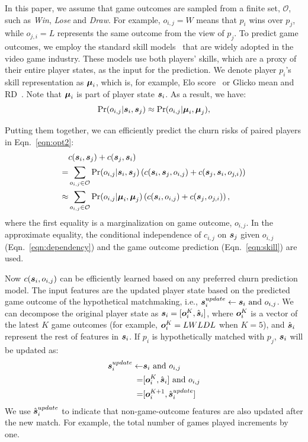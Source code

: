 In this paper, we assume that game outcomes are sampled from a finite set, $\mathcal{O}$, such as \emph{Win}, \emph{Lose} and \emph{Draw}. For example, $o_{i,j}=W$ means that $p_i$ wins over $p_j$, while $o_{j,i}=L$ represents the same outcome from the view of $p_j$. To predict game outcomes, we employ the standard skill models~\cite{elo1978rating,glickman1999parameter} that are widely adopted in the video game industry. These models use both players' skills, which are a proxy of their entire player states, as the input for the prediction. We denote player $p_i$'s skill representation as $\boldsymbol{\mu}_i$, which is, for example, Elo score~\cite{elo1978rating} or Glicko mean and RD~\cite{glickman1999parameter}. Note that $\boldsymbol{\mu}_i$ is part of player state $\boldsymbol{s}_i$.  As a result, we have:
\begin{equation}\label{eqn:skill}
\Pr(o_{i,j}|\boldsymbol{s}_i, \boldsymbol{s}_j) \approx \Pr(o_{i,j}|\boldsymbol{\mu}_i, \boldsymbol{\mu}_j),
\end{equation}

Putting them together, we can efficiently predict the churn risks of paired players in Eqn.~\ref{eqn:opt2}:
\begin{align}
&c(\boldsymbol{s}_i, \boldsymbol{s}_j) + c(\boldsymbol{s}_j, \boldsymbol{s}_i) \label{eqn:c1} \\
=& \sum\limits_{o_{i,j} \in \mathcal{O}} \Pr(o_{i,j}|\boldsymbol{s}_i, \boldsymbol{s}_j)\left( c(\boldsymbol{s}_i, \boldsymbol{s}_j, o_{i,j}) + c(\boldsymbol{s}_j, \boldsymbol{s}_i, o_{j,i}) \right) \label{eqn:c2} \\
\approx & \sum\limits_{o_{i,j} \in \mathcal{O}} \Pr(o_{i,j}|\boldsymbol{\mu}_i, \boldsymbol{\mu}_j)\left( c(\boldsymbol{s}_i, o_{i,j}) + c(\boldsymbol{s}_j, o_{j,i}) \right), \label{eqn:c3}
\end{align}
where the first equality is a marginalization on game outcome, $o_{i,j}$. In the approximate equality, the conditional independence of $c_{i,j}$ on $\boldsymbol{s}_j$ given $o_{i,j}$ (Eqn.~\ref{eqn:dependency}) and the game outcome prediction (Eqn.~\ref{eqn:skill}) are used.

Now $c(\boldsymbol{s}_i, o_{i,j})$ can be efficiently learned based on any preferred churn prediction model. The input features are the updated player state based on the predicted game outcome of the hypothetical matchmaking, i.e., $\boldsymbol{s}_i^{update} \leftarrow \boldsymbol{s}_i \text{ and } o_{i,j}$. We can decompose the original player state as $\boldsymbol{s}_i = [\boldsymbol{o}_i^K, \hat{\boldsymbol{s}}_i]$, where $\boldsymbol{o}_i^K$ is a vector of the latest $K$ game outcomes (for example, $\boldsymbol{o}_i^K=LWLDL$ when $K=5$), and $\hat{\boldsymbol{s}}_i$ represent the rest of features in $\boldsymbol{s}_i$. If $p_i$ is hypothetically matched with $p_j$, $\boldsymbol{s}_i$ will be updated as:
\begin{align}\label{eqn:stateUpdate}
\boldsymbol{s}_i^{update} \leftarrow& \boldsymbol{s}_i \text{ and } o_{i,j} \\
                    =& [\boldsymbol{o}_i^K, \hat{\boldsymbol{s}}_i] \text{ and } o_{i,j} \\
                    =& [\boldsymbol{o}_i^{K+1}, \hat{\boldsymbol{s}}_i^{update}]
\end{align}
We use $\hat{\boldsymbol{s}}_i^{update}$ to indicate that non-game-outcome features are also updated after the new match. For example, the total number of games played increments by one. 


